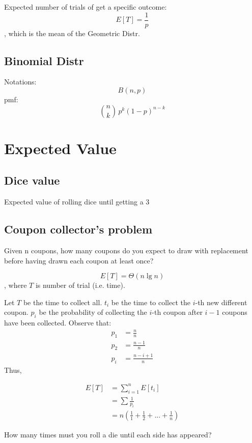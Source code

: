 Expected number of trials of get a specific outcome:
$$
E[T] = \frac{1}{p}
$$
, which is the mean of the Geometric Distr. 
\subsection{Binomial Distr}
Notations:
$$
B(n, p)
$$
pmf:
$$
{n \choose k}\,p^{k}(1-p)^{n-k}
$$

\section{Expected Value}
\subsection{Dice value}
Expected value of rolling dice until getting a 3
\subsection{Coupon collector's problem}
Given n coupons, how many coupons do you expect to draw with replacement before having drawn each coupon at least once?

$$
E[T] = \Theta(n \lg n)
$$
, where $T$ is number of trial (i.e. time).

Let $T$ be the time to collect all. $t_i$ be the time to collect the $i$-th new different coupon. $p_i$ be the probability of collecting the $i$-th coupon after $i-1$ coupons have been collected. Observe that:
\begin{align*}
p_1 &= \frac{n}{n} \\ 
p_2 &= \frac{n-1}{n} \\
p_i &= \frac{n-i+1}{n}
\end{align*}
Thus,

\begin{align*}
E[T] &= \sum_{i=1}^n E[t_i] \\
&= \sum \frac{1}{p_i} \\
&= n(\frac{1}{1}+\frac{1}{2}+...+\frac{1}{n})
\end{align*}

 How many times must you roll a die until each side has appeared?
